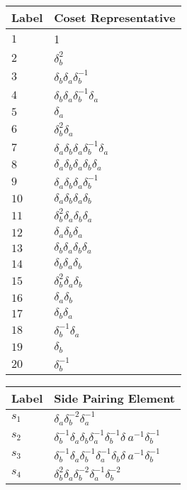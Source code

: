 \documentclass{article}
\begin{document}

\begin{center}
\begin{tabular}{ll}
\toprule
Label & Coset Representative\\
\midrule
$1$ & 1 \\
$2$ & $\delta_b^{2}$ \\
$3$ & $\delta_b^{}\delta_a^{}\delta_b^{-1}$ \\
$4$ & $\delta_b^{}\delta_a^{}\delta_b^{-1}\delta_a^{}$ \\
$5$ & $\delta_a^{}$ \\
$6$ & $\delta_b^{2}\delta_a^{}$ \\
$7$ & $\delta_a^{}\delta_b^{}\delta_a^{}\delta_b^{-1}\delta_a^{}$ \\
$8$ & $\delta_a^{}\delta_b^{}\delta_a^{}\delta_b^{}\delta_a^{}$ \\
$9$ & $\delta_a^{}\delta_b^{}\delta_a^{}\delta_b^{-1}$ \\
$10$ & $\delta_a^{}\delta_b^{}\delta_a^{}\delta_b^{}$ \\
$11$ & $\delta_b^{2}\delta_a^{}\delta_b^{}\delta_a^{}$ \\
$12$ & $\delta_a^{}\delta_b^{}\delta_a^{}$ \\
$13$ & $\delta_b^{}\delta_a^{}\delta_b^{}\delta_a^{}$ \\
$14$ & $\delta_b^{}\delta_a^{}\delta_b^{}$ \\
$15$ & $\delta_b^{2}\delta_a^{}\delta_b^{}$ \\
$16$ & $\delta_a^{}\delta_b^{}$ \\
$17$ & $\delta_b^{}\delta_a^{}$ \\
$18$ & $\delta_b^{-1}\delta_a^{}$ \\
$19$ & $\delta_b^{}$ \\
$20$ & $\delta_b^{-1}$ \\
\bottomrule
\end{tabular}
\hfill
\begin{tabular}{ll}
\toprule
Label & Side Pairing Element\\
\midrule
$s_{1}$ & $\delta_a^{}\delta_b^{-2}\delta_a^{-1}$ \\
$s_{2}$ & $\delta_b^{-1}\delta_a^{}\delta_b^{}\delta_a^{-1}\delta_b^{-1}\delta_\
a^{-1}\delta_b^{-1}$ \\
$s_{3}$ & $\delta_b^{-1}\delta_a^{}\delta_b^{-1}\delta_a^{-1}\delta_b^{}\delta_\
a^{-1}\delta_b^{-1}$ \\
$s_{4}$ & $\delta_b^{2}\delta_a^{}\delta_b^{-2}\delta_a^{-1}\delta_b^{-2}$ \\

\end{tabular}
\end{center}
\end{document}
